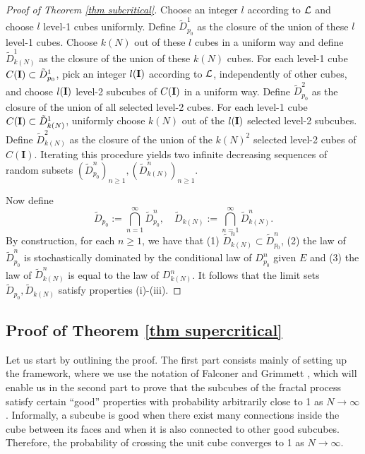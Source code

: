 \documentclass[11pt,a4paper]{article}
\newcommand{\Ib}{\ensuremath{\mathbf{I}}}
\theoremstyle{remark}
\begin{document}
\begin{proof}[Proof of Theorem \ref{thm subcritical}]
Choose an integer $l$ according to ${\cal L}$ and choose $l$ level-1 cubes uniformly. Define $\tilde D_{p_0}^1$ as the closure of the union of these $l$ level-1 cubes. Choose $k(N)$ out of these $l$ cubes in a uniform way and define $\tilde D_{k(N)}^1$ as the closure of the union of these $k(N)$ cubes.  For each level-1 cube $C({\bf I}) \subset \tilde D_{p_0}^1$, pick an integer $l({\bf I})$ according to ${\cal L}$, independently of other cubes, and choose $l({\bf I})$ level-2 subcubes of $C({\bf I})$ in a uniform way. Define $\tilde D_{p_0}^2$ as the closure of the union of all selected level-2 cubes. For each level-1 cube $C({\bf I}) \subset \tilde D_{k(N)}^1$, uniformly choose $k(N)$ out of the $l({\bf I})$ selected level-2 subcubes. Define $\tilde D_{k(N)}^2$ as the closure of the union of the $k(N)^2$ selected level-2 cubes of $C(\Ib)$. Iterating this procedure yields two infinite decreasing sequences of random subsets $(\tilde{D}_{p_{0}}^n)_{n\geq 1}, (\tilde{D}_{k(N)}^n)_{n\geq 1}$.


Now define 
\[
 \tilde D_{p_0} := \bigcap_{n=1}^{\infty} \tilde D_{p_0}^n,\quad \tilde D_{k(N)} := \bigcap_{n=1}^{\infty} \tilde D_{k(N)}^n.
\]
By construction, for each $n\geq 1$, we have that (1) $\tilde D_{k(N)}^n \subset \tilde D_{p_0}^n$, (2) the law of $\tilde{D}_{p_{0}}^n$ is stochastically dominated by the conditional law of $D_{p_{0}}^n$ given $E$ and (3) the law of $\tilde D_{k(N)}^n$ is equal to the law of $D_{k(N)}^n$. It follows that the limit sets $\tilde{D}_{p_{0}},\tilde{D}_{k(N)}$ satisfy properties (i)-(iii).
\end{proof}


\subsection{Proof of Theorem \ref{thm supercritical}}\label{sec supercritical}

Let us start by outlining the proof. The first part consists mainly of setting up the framework, where we use the notation of Falconer and Grimmett \cite{FalGri}, which will enable us in the second part to prove that the subcubes of the fractal process satisfy certain ``good'' properties with probability arbitrarily close to 1 as $N\to \infty$. Informally, a subcube is good when there exist many connections inside the cube between its faces and when it is also connected to other good subcubes. Therefore, the probability of crossing the unit cube converges to 1 as $N\to\infty$.
\end{document}
